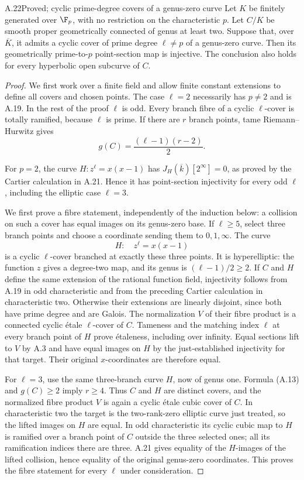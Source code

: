 \begin{claim}{A.22}{Proved; cyclic prime-degree covers of a genus-zero curve}
Let $K$ be finitely generated over $\F_p$, with no restriction
on the characteristic $p$.
Let $C/K$ be smooth proper geometrically connected of genus
at least two. Suppose that, over $\overline K$, it admits a
cyclic cover of prime degree $\ell\ne p$ of a genus-zero
curve. Then its geometrically prime-to-$p$ point-section map
is injective. The conclusion also holds for every hyperbolic
open subcurve of $C$.
\end{claim}
\begin{proof}
We first work over a finite field and allow finite constant
extensions to define all covers and chosen points. The case
$\ell=2$ necessarily has $p\ne2$ and is A.19. In the rest
of the proof $\ell$ is odd.
Every branch fibre of a cyclic $\ell$-cover is totally
ramified, because $\ell$ is prime. If there are $r$ branch
points, tame Riemann--Hurwitz gives
\[
 g(C)=\frac{(\ell-1)(r-2)}2.                                  \tag{A.13}
\]

For $p=2$, the curve $H:z^\ell=x(x-1)$ has
$J_H(\overline k)[2^\infty]=0$, as proved by the Cartier
calculation in A.21. Hence it has point-section
injectivity for every odd $\ell$, including the elliptic
case $\ell=3$.

We first prove a fibre statement, independently of the
induction below: a collision on such a cover has equal
images on its genus-zero base. If $\ell\ge5$, select three
branch points and choose a coordinate sending them to
$0,1,\infty$. The curve
\[
 H:\quad z^\ell=x(x-1)
\]
is a cyclic $\ell$-cover branched at exactly these three
points. It is hyperelliptic: the function $z$ gives a
degree-two map, and its genus is $(\ell-1)/2\ge2$.
If $C$ and $H$ define the same extension of the rational
function field, injectivity follows from A.19 in odd
characteristic and from the preceding Cartier calculation
in characteristic two.
Otherwise their extensions are linearly disjoint, since
both have prime degree and are Galois. The normalization
$V$ of their fibre product is a connected cyclic \'etale
$\ell$-cover of $C$. Tameness and the matching index
$\ell$ at every branch point of $H$ prove \'etaleness,
including over infinity. Equal sections lift to $V$ by
A.3 and have equal images on $H$ by the just-established
injectivity for that target. Their original
$x$-coordinates are therefore equal.

For $\ell=3$, use the same three-branch curve $H$, now of
genus one. Formula (A.13) and $g(C)\ge2$ imply $r\ge4$.
Thus $C$ and $H$ are distinct covers, and the normalized
fibre product $V$ is again a cyclic \'etale cubic cover of
$C$. In characteristic two the target is the
two-rank-zero elliptic curve just treated, so the lifted
images on $H$ are equal. In odd characteristic its cyclic
cubic map to $H$ is ramified over a branch
point of $C$ outside the three selected ones; all its
ramification indices there are three. A.21 gives equality
of the $H$-images of the lifted collision, hence equality
of the original genus-zero coordinates. This proves the
fibre statement for every $\ell$ under consideration.


\end{proof}
